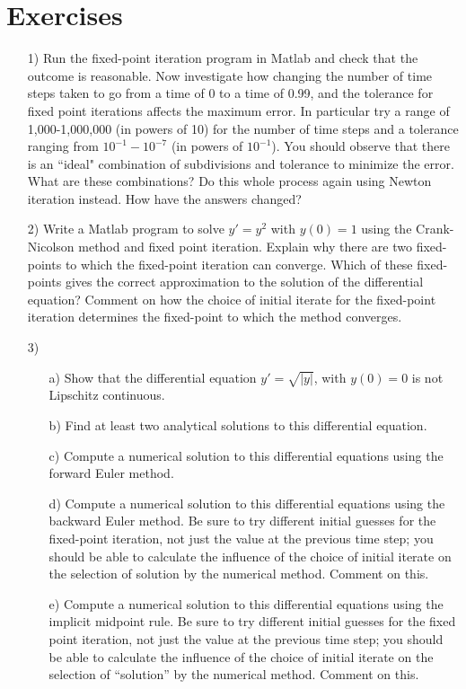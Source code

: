 \section{Exercises}
\begin{enumerate}
\item[1)] Run the fixed-point iteration program in Matlab and check that the outcome is reasonable. Now investigate how changing the number of time steps taken to go from a time of 0 to a time of 0.99, and the tolerance for fixed point iterations affects the maximum error. In particular try a range of 1,000-1,000,000 (in powers of 10) for the number of time steps and a tolerance ranging from $10^{-1}-10^{-7}$ (in powers of $10^{-1}$). You should observe that there is an ``ideal"  combination of subdivisions and tolerance to minimize the error. What are these combinations? Do this whole process again using Newton iteration instead. How have the answers changed?
\item[2)] Write a Matlab program to solve $y'=y^2$ with $y(0)=1$ using the Crank-Nicolson method and fixed point iteration. Explain why there are two fixed-points to which the fixed-point iteration can converge. Which of these fixed-points gives the correct approximation to the solution of the differential equation? Comment on how the choice of initial iterate for the fixed-point iteration determines the fixed-point to which the method converges. 
\item[3)] 
\begin{enumerate}
\item[a)] Show that the differential equation $y'=\sqrt{\lvert y\rvert}$, with $y(0)=0$ is not Lipschitz continuous. 
\item[b)] Find at least two analytical solutions to this differential equation.
\item[c)] Compute a numerical solution to this differential equations using the forward Euler method.
\item[d)] Compute a numerical solution to this differential equations using the backward Euler method. Be sure to try different initial guesses for the fixed-point iteration, not just the value at the previous time step; you should be able to calculate the influence of the choice of initial iterate on the selection of solution by the numerical method. Comment on this.
\item[e)] Compute a numerical solution to this differential equations using the implicit midpoint rule. Be sure to try different initial guesses for the fixed point iteration, not just the value at the previous time step; you should be able to calculate the influence of the choice of initial iterate on the selection of ``solution'' by the numerical method. Comment on this.

\end{enumerate}
\end{enumerate}
